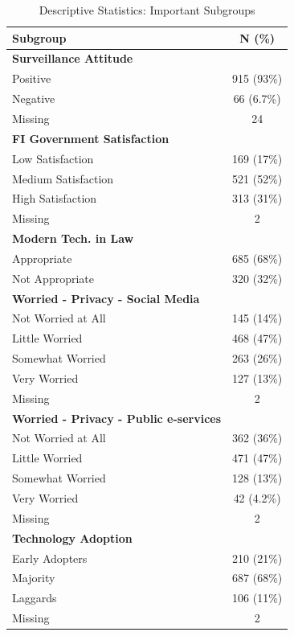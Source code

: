 \begin{table}[h]
\centering
\fontsize{12pt}{14pt}\selectfont
\begin{tabular}{@{}l c@{}}
\toprule
\textbf{Subgroup} & \textbf{N (\%)} \\
\midrule
\addlinespace[2.5pt]
\textbf{Surveillance Attitude} \\
\quad Positive           & 915 (93\%)   \\ 
\quad Negative           & 66 (6.7\%)   \\ 
\quad Missing            & 24           \\ 
\midrule
\addlinespace[2.5pt]
\textbf{FI Government Satisfaction} \\
\quad Low Satisfaction   & 169 (17\%)   \\ 
\quad Medium Satisfaction & 521 (52\%) \\
\quad High Satisfaction  & 313 (31\%)   \\ 
\quad Missing            & 2            \\ 
\midrule
\addlinespace[2.5pt]
\textbf{Modern Tech. in Law} \\
\quad Appropriate        & 685 (68\%)   \\ 
\quad Not Appropriate    & 320 (32\%)   \\ 
\midrule
\addlinespace[2.5pt]
\textbf{Worried - Privacy - Social Media} \\
\quad Not Worried at All & 145 (14\%)   \\ 
\quad Little Worried     & 468 (47\%)   \\ 
\quad Somewhat Worried   & 263 (26\%)   \\ 
\quad Very Worried       & 127 (13\%)   \\ 
\quad Missing            & 2            \\ 
\midrule
\addlinespace[2.5pt]
\textbf{Worried - Privacy - Public e-services} \\
\quad Not Worried at All & 362 (36\%)   \\ 
\quad Little Worried     & 471 (47\%)   \\ 
\quad Somewhat Worried   & 128 (13\%)   \\ 
\quad Very Worried       & 42 (4.2\%)   \\ 
\quad Missing            & 2            \\ 
\midrule
\addlinespace[2.5pt]
\textbf{Technology Adoption} \\
\quad Early Adopters     & 210 (21\%)   \\ 
\quad Majority           & 687 (68\%)   \\ 
\quad Laggards           & 106 (11\%)   \\ 
\quad Missing            & 2            \\ 
\bottomrule
\end{tabular}
\caption{Descriptive Statistics: Important Subgroups}
\label{tab:impsubgroup}
\end{table}

